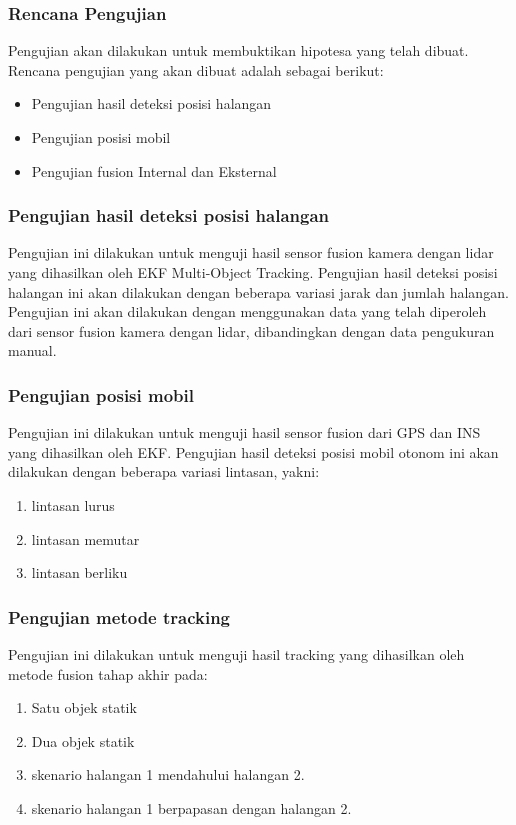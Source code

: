 \begin{frame}
    \frametitle{Rencana Pengujian}
    \justifying
    Pengujian akan dilakukan untuk membuktikan hipotesa yang telah dibuat. Rencana pengujian yang akan dibuat adalah sebagai berikut:
    \begin{itemize}
        \item Pengujian hasil deteksi posisi halangan
        \item Pengujian posisi mobil
        \item Pengujian fusion Internal dan Eksternal
    \end{itemize}
\end{frame}


\begin{frame}
    \frametitle{Pengujian hasil deteksi posisi halangan}
    \justifying
    Pengujian ini dilakukan untuk menguji hasil sensor fusion kamera dengan lidar yang dihasilkan oleh EKF Multi-Object Tracking. Pengujian hasil deteksi posisi halangan ini akan dilakukan dengan beberapa variasi jarak dan jumlah halangan. Pengujian ini akan dilakukan dengan menggunakan data yang telah diperoleh dari sensor fusion kamera dengan lidar, dibandingkan dengan data pengukuran manual.
\end{frame}


\begin{frame}
    \frametitle{Pengujian posisi mobil}
    \justifying
    Pengujian ini dilakukan untuk menguji hasil sensor fusion dari GPS dan INS yang dihasilkan oleh EKF. Pengujian hasil deteksi posisi mobil otonom ini akan dilakukan dengan beberapa variasi lintasan, yakni:
    \begin{enumerate}
        \item lintasan lurus
        \item lintasan memutar
        \item lintasan berliku
    \end{enumerate}
\end{frame}


\begin{frame}
    \frametitle{Pengujian metode tracking}
    \justifying
    Pengujian ini dilakukan untuk menguji hasil tracking yang dihasilkan oleh metode fusion tahap akhir pada:
    \begin{enumerate}
        \item Satu objek statik
        \item Dua objek statik
        \item skenario halangan 1 mendahului halangan 2.
        \item skenario halangan 1 berpapasan dengan halangan 2.
    \end{enumerate}
\end{frame}
